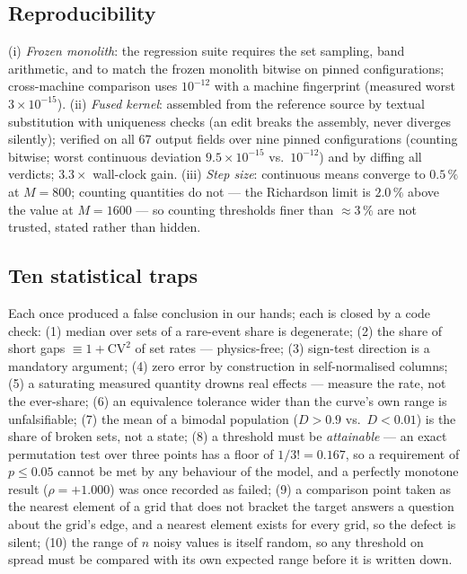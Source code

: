 \documentclass[11pt,a4paper]{article}
\theoremstyle{remark}
\newcommand{\code}[1]{\texttt{\detokenize{#1}}}
\begin{document}
\subsection{Reproducibility}\label{sec:repro}
(i) \emph{Frozen monolith}: the regression suite requires the set sampling,
band arithmetic, and \code{simulate} to match the frozen monolith bitwise on pinned
configurations; cross-machine comparison uses $10^{-12}$ with a machine fingerprint
(measured worst $3\times10^{-15}$). (ii) \emph{Fused kernel}: assembled from the
reference source by textual substitution with uniqueness checks (an edit breaks the
assembly, never diverges silently); verified on all 67 output fields over nine pinned
configurations (counting bitwise; worst continuous deviation $9.5\times10^{-15}$ vs.\
$10^{-12}$) and by diffing all verdicts; $3.3\times$ wall-clock gain. (iii) \emph{Step
size}: continuous means converge to $0.5\,\%$ at $M=800$; counting quantities do not ---
the Richardson limit is $2.0\,\%$ above the value at $M=1600$ --- so counting thresholds
finer than $\approx3\,\%$ are not trusted, stated rather than hidden.

\subsection{Ten statistical traps}\label{sec:traps}
Each once produced a false conclusion in our hands; each is closed by a code check:
(1) median over sets of a rare-event share is degenerate; (2) the share of short gaps
$\equiv1+\mathrm{CV}^2$ of set rates --- physics-free; (3) sign-test direction is a
mandatory argument; (4) zero error by construction in self-normalised columns;
(5) a saturating measured quantity drowns real effects --- measure the rate, not the
ever-share; (6) an equivalence tolerance wider than the curve's own range is
unfalsifiable; (7) the mean of a bimodal population ($D>0.9$ vs.\ $D<0.01$) is the share
of broken sets, not a state; (8) a threshold must be \emph{attainable} --- an exact permutation
test over three points has a floor of $1/3!=0.167$, so a requirement of $p\le0.05$ cannot be met
by any behaviour of the model, and a perfectly monotone result ($\rho=+1.000$) was once recorded
as failed; (9) a comparison point taken as the nearest element of a grid that does not bracket the
target answers a question about the grid's edge, and a nearest element exists for every grid, so
the defect is silent; (10) the range of $n$ noisy values is itself random, so any threshold on
spread must be compared with its own expected range before it is written down.
\end{document}
